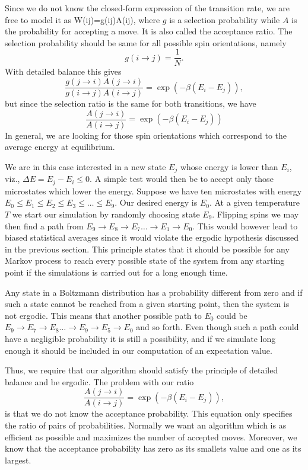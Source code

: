 Since we do not know the closed-form expression of the transition rate, we are free to model it as
       \be W(i\rightarrow j)=g(i\rightarrow j)A(i\rightarrow j),  \ee
where $g$ is a selection probability while  $A$ is the probability for accepting a
move. It is also called the acceptance ratio.
The selection probability should be same for all possible spin orientations, namely
\[
    g(i\rightarrow j) = \frac{1}{N}.
\]
With detailed balance this gives
\[
\frac{g(j\rightarrow i)A(j\rightarrow i)}{g(i\rightarrow j)
 A(i\rightarrow j)}= \exp{(-\beta(E_i-E_j))}, 
\]
but since the selection ratio is the same for both transitions, we have
\[
\frac{A(j\rightarrow i)}{A(i\rightarrow j)}= \exp{(-\beta(E_i-E_j))} 
\]
In general, we are looking for those spin orientations which correspond to the average
energy at equilibrium. 

We are in this case interested in a new state $E_j$ whose energy is lower than 
$E_i$, viz., $\Delta E = E_j-E_i \le 0$. A simple test would then be to accept only those
microstates which lower the energy.  
Suppose we have ten microstates with energy $E_0 \le E_1 \le E_2 \le E_3 \le \dots \le E_9$.
Our desired energy is $E_0$.
At a given temperature $T$ we start our simulation by randomly choosing state
$E_9$. Flipping spins we may then find a path from $E_9\rightarrow E_8 \rightarrow E_7 \dots \rightarrow E_1 \rightarrow E_0$. 
This would however lead to biased statistical averages since it would violate the ergodic hypothesis discussed
in the previous section. This principle states  that 
it should be possible for any Markov process to reach every possible state of the system
from any starting point if the simulations is carried out for a long enough time.

Any state in a Boltzmann distribution has a probability different from zero and if such 
a state cannot be reached from a given starting point, then the system is not ergodic.
This means that another possible path to $E_0$ could be 
$E_9\rightarrow E_7 \rightarrow E_8 \dots \rightarrow E_9 \rightarrow E_5 \rightarrow E_0$ and so forth.
Even though such a path could have a negligible probability it is still a possibility, and if
we simulate long enough it should be included in our computation of an expectation value.

Thus, we require that our algorithm should satisfy the principle of detailed balance and be ergodic. 
The problem with our ratio
\[
\frac{A(j\rightarrow i)}{A(i\rightarrow j)}= \exp{(-\beta(E_i-E_j))}, 
\]
is that we do not know the acceptance probability. This equation only specifies the ratio of pairs of probabilities. Normally we want an algorithm which is as efficient as possible and maximizes the number of accepted moves. 
Moreover, we know that the acceptance probability has zero as its smallets value and one as its largest. 

